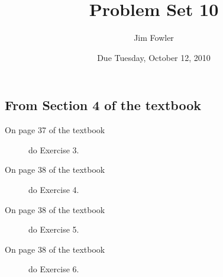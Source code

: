 \documentclass[12pt]{handout}
\author{Jim Fowler}
\title{Problem Set 10}
\date{Due Tuesday, October 12, 2010}
\begin{document}
\maketitle










\subsection*{From Section 4 of the textbook}



\begin{description}

\item[On page 37 of the textbook] do Exercise 3.

\item[On page 38 of the textbook] do Exercise 4.

\item[On page 38 of the textbook] do Exercise 5.

\item[On page 38 of the textbook] do Exercise 6.

\end{description}
\end{document}
